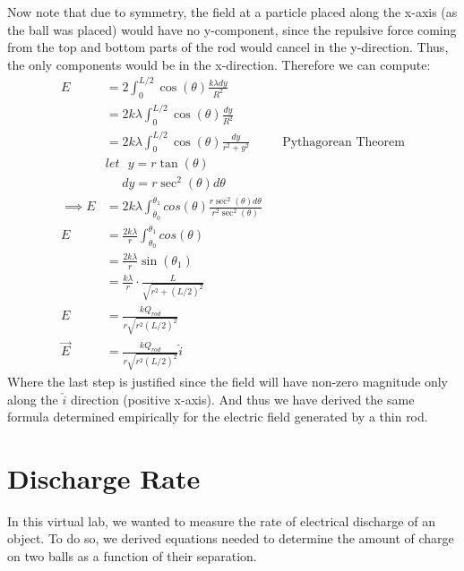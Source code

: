 \documentclass[oneside,12pt]{amsart}
\begin{document}
	\indent Now note that due to symmetry, the field at a particle placed along the x-axis (as the ball was placed) would have no y-component, since the repulsive force coming from the top and bottom parts of the rod would cancel in the y-direction. Thus, the only components would be in the x-direction. Therefore we can compute:
	\begin{align*}
	E &= 2\int_0^{L/2}\cos(\theta)\frac{k\lambda dy}{R^2}\\
	&=2k\lambda \int_0^{L/2} \cos(\theta)\frac{dy}{R^2}\\
	&=2k\lambda \int_0^{L/2} \cos(\theta)\frac{dy}{r^2+y^2} &&\text{Pythagorean Theorem}\\
	&let\:\:\:y=r\tan(\theta)\\
	&\:\:\: \:\:\:dy = r\sec^2(\theta)d\theta\\
	\implies E&=2k\lambda \int_{\theta_0}^{\theta_1} cos(\theta) \frac{r\sec^2(\theta)d\theta}{r^2\sec^2(\theta)}\\
	E&=\frac{2k\lambda}{r} \int_{\theta_0}^{\theta_1} cos(\theta) \\
	&=\frac{2k\lambda}{r}\sin(\theta_1)\\
	&=\frac{k\lambda}{r}\cdot\frac{L}{\sqrt{r^2+(L/2)^2}}\\
	E&= \frac{kQ_{rod}}{r\sqrt{r^2(L/2)^2}}\\
	\vec{E} &=  \frac{kQ_{rod}}{r\sqrt{r^2(L/2)^2}}\hat{i}
	\end{align*}
	Where the last step is justified since the field will have non-zero magnitude only along the $\hat{i}$ direction (positive x-axis).
	And thus we have derived the same formula determined empirically for the electric field generated by a thin rod.
	
	\section{Discharge Rate}
	In this virtual lab, we wanted to measure the rate of electrical discharge of an object. To do so, we derived equations needed to determine the amount of charge on two balls as a function of their separation.\\
	
\end{document}
